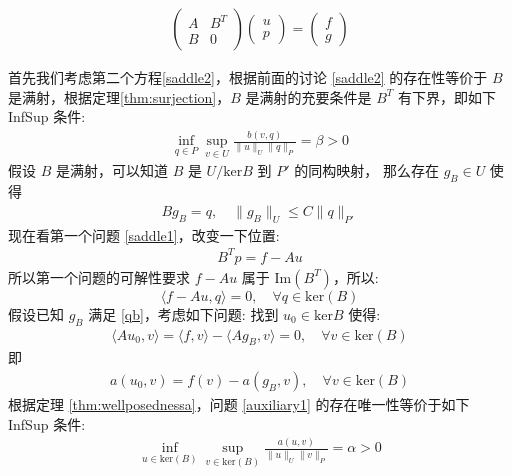 \documentclass[lang=cn,a4paper,newtx]{elegantpaper}
\begin{document}
\begin{align}
\begin{pmatrix}
A & B^T\\
B & 0
\end{pmatrix}
\begin{pmatrix}
u\\
p
\end{pmatrix}
=
\begin{pmatrix}
f\\
g
\end{pmatrix}
\end{align}

首先我们考虑第二个方程\eqref{saddle2}，根据前面的讨论 \eqref{saddle2}
的存在性等价于 $B$ 是满射，根据定理\ref{thm:surjection}，$B$ 是满射的充要条件是 
$B^T$ 有下界，即如下 InfSup 条件:
\begin{equation}
\label{infsupb}
\begin{aligned}
\inf_{q\in P}\sup_{v\in U}\frac{b(v, q)}{\|u\|_U\|q\|_P} = \beta > 0
\end{aligned}
\end{equation}
假设 $B$ 是满射，可以知道 $B$ 是 $U/\mathrm{ker} B$ 到 $P'$ 的同构映射，
那么存在 $g_B\in U$ 使得 
\begin{equation}
  \begin{aligned}
    \label{qb}
    Bg_B = q, \quad
    \|g_B\|_U \leq C\|q\|_{P'}
  \end{aligned}
\end{equation}
现在看第一个问题 \eqref{saddle1}，改变一下位置:
\begin{align}
B^Tp = f - Au
\end{align}
所以第一个问题的可解性要求 $f - Au$ 属于 $\mathrm{Im}(B^T)$，所以:
$$
\langle f - Au,  q\rangle = 0, \quad \forall q \in \mathrm{ker}(B)
$$
假设已知 $g_B$ 满足 \eqref{qb}，考虑如下问题: 找到 $u_0\in \mathrm{ker} B$ 使得:
\begin{align}
\label{auxiliary}
\langle A u_0,  v\rangle = \langle f,  v\rangle - \langle Ag_B,  v\rangle = 0,
\quad \forall v \in \mathrm{ker}(B)
\end{align}
即
\begin{align}
\label{auxiliary1}
a(u_0, v) = f(v) - a(g_B, v), \quad \forall v \in \mathrm{ker}(B) 
\end{align}
根据定理 \ref{thm:wellposednessa}，问题 \eqref{auxiliary1} 的存在唯一性等价于如下
InfSup 条件:
\begin{align}
\label{infsupauxiliary}
\inf_{u\in \mathrm{ker}(B)}\sup_{v\in \mathrm{ker}(B)}\frac{a(u,
v)}{\|u\|_U\|v\|_P} = \alpha > 0
\end{align}
\end{document}
